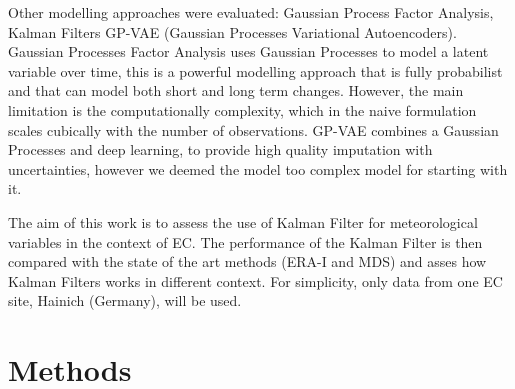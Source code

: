 \documentclass{article}
\let\Oldsection\section
\renewcommand{\section}{\FloatBarrier\Oldsection}
\begin{document}
Other modelling approaches were evaluated: Gaussian Process Factor Analysis, Kalman Filters GP-VAE (Gaussian Processes Variational Autoencoders). Gaussian Processes Factor Analysis \cite{yu_gaussian-process_2008} uses Gaussian Processes to model a latent variable over time, this is a powerful modelling approach that is fully probabilist and that can model both short and long term changes. However, the main limitation is the computationally complexity, which in the naive formulation scales cubically with the number of observations.
GP-VAE combines a \cite{fortuin_gp-vae_2020} Gaussian Processes and deep learning, to provide high quality imputation with uncertainties, however we deemed the model too complex model for starting with it.

The aim of this work is to assess the use of Kalman Filter for meteorological variables in the context of EC. The performance of the Kalman Filter is then compared with the state of the art methods (ERA-I and MDS) and asses how Kalman Filters works in different context. For simplicity, only data from one EC site, Hainich (Germany), will be used.


\section{Methods}
\end{document}

